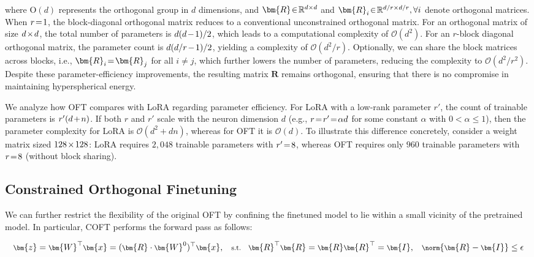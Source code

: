 where $\text{O}(d)$ represents the orthogonal group in $d$ dimensions, and $\thickmuskip=2mu \medmuskip=2mu \bm{R}\in\mathbb{R}^{d\times d}$ and $\thickmuskip=2mu \medmuskip=2mu \bm{R}_i\in\mathbb{R}^{d/r\times d/r}, \forall i$ denote orthogonal matrices. When $\thickmuskip=2mu \medmuskip=2mu r=1$, the block-diagonal orthogonal matrix reduces to a conventional unconstrained orthogonal matrix. For an orthogonal matrix of size $\thickmuskip=2mu \medmuskip=2mu d \times d$, the total number of parameters is $\thickmuskip=2mu \medmuskip=2mu d(d-1)/2$, which leads to a computational complexity of $\mathcal{O}(d^2)$. For an $r$-block diagonal orthogonal matrix, the parameter count is $\thickmuskip=2mu \medmuskip=2mu d(d/r - 1)/2$, yielding a complexity of $\mathcal{O}(d^2 / r)$. Optionally, we can share the block matrices across blocks, i.e., $\thickmuskip=2mu \medmuskip=2mu \bm{R}_i = \bm{R}_j$ for all $i \neq j$, which further lowers the number of parameters, reducing the complexity to $\mathcal{O}(d^2 / r^2)$. Despite these parameter-efficiency improvements, the resulting matrix $\bm{R}$ remains orthogonal, ensuring that there is no compromise in maintaining hyperspherical energy.

We analyze how OFT compares with LoRA regarding parameter efficiency. For LoRA with a low-rank parameter $r'$, the count of trainable parameters is $\thickmuskip=2mu \medmuskip=2mu r'(d + n)$. If both $r$ and $r'$ scale with the neuron dimension $d$ (e.g., $\thickmuskip=2mu \medmuskip=2mu r = r' = \alpha d$ for some constant $\alpha$ with $0 < \alpha \leq 1$), then the parameter complexity for LoRA is $\mathcal{O}(d^2 + dn)$, whereas for OFT it is $\mathcal{O}(d)$. To illustrate this difference concretely, consider a weight matrix sized $\thickmuskip=2mu \medmuskip=2mu 128 \times 128$: LoRA requires $2,048$ trainable parameters with $\thickmuskip=2mu \medmuskip=2mu r' = 8$, whereas OFT requires only $960$ trainable parameters with $\thickmuskip=2mu \medmuskip=2mu r=8$ (without block sharing).

\subsection{Constrained Orthogonal Finetuning}

We can further restrict the flexibility of the original OFT by confining the finetuned model to lie within a small vicinity of the pretrained model. In particular, COFT performs the forward pass as follows:

\begin{equation}\label{eq:coft_general}
    \footnotesize
    \bm{z} = \bm{W}^\top \bm{x} = (\bm{R} \cdot \bm{W}^0)^\top \bm{x}, \quad \text{s.t.} \quad \bm{R}^\top \bm{R} = \bm{R} \bm{R}^\top = \bm{I}, \quad \norm{\bm{R} - \bm{I}} \leq \epsilon
\end{equation}

